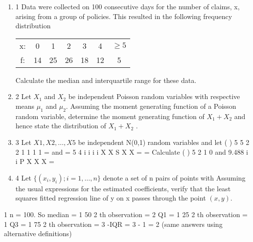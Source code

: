 \documentclass[a4paper,12pt]{article}
\begin{document}
\begin{enumerate}

\item 1 Data were collected on 100 consecutive days for the number of claims, x, arising
from a group of policies. This resulted in the following frequency distribution
\begin{center}
\begin{tabular}{c|c|c|c|c|c|c}
x: & 0 & 1 & 2 & 3 & 4 & $\geq 5$ \\
f: & 14 & 25 & 26 & 18 &  12 & 5 \\
\end{tabular}
\end{center}
Calculate the median and interquartile range for these data. 

\item 2 Let $X_1$ and $X_2$ be independent Poisson random variables with respective means $\mu_1$ and $\mu_2$.
Assuming the moment generating function of a Poisson random variable, determine the moment generating function of $X_1 + X_2$ and hence state the distribution of $X_1 + X_2$ . 

\item 3 Let $X1 , X2 , \ldots , X5$ be independent N(0,1) random variables and let
( ) 5 5 2 2
1 1
1 1
= and =
5 4 i i
i i
X X S X X
= =
Calculate ( ) 5 2
1
0 and 9.488 i
i
P X X X
=

\item 4 Let $\{(x_i , y_i); i = 1, \ldots , n\}$ denote a set of n pairs of points with Assuming the usual expressions for the estimated coefficients, verify that the least squares fitted regression line of y on x passes through the point $(x, y)$. 
\end{enumerate}

\newpage

1 n = 100. So median =
1
50
2
th observation = 2
Q1 =
1
25
2
th observation = 1
Q3 =
1
75
2
th observation = 3 -IQR = 3 - 1 = 2
(same answers using alternative definitions)
\end{document}
